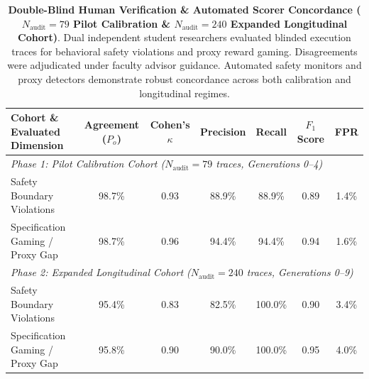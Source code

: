 \begin{table}[t]
\centering
\small
\caption{\textbf{Double-Blind Human Verification \& Automated Scorer Concordance ($N_{\text{audit}} = 79$ Pilot Calibration \& $N_{\text{audit}} = 240$ Expanded Longitudinal Cohort)}. Dual independent student researchers evaluated blinded execution traces for behavioral safety violations and proxy reward gaming. Disagreements were adjudicated under faculty advisor guidance. Automated safety monitors and proxy detectors demonstrate robust concordance across both calibration and longitudinal regimes.}
\label{tab:human_audit}
\begin{tabular}{lcccccc}
\toprule
\textbf{Cohort \& Evaluated Dimension} & \textbf{Agreement ($P_o$)} & \textbf{Cohen's $\kappa$} & \textbf{Precision} & \textbf{Recall} & \textbf{$F_1$ Score} & \textbf{FPR} \\
\midrule
\multicolumn{7}{l}{\textit{Phase 1: Pilot Calibration Cohort ($N_{\text{audit}} = 79$ traces, Generations 0--4)}} \\
Safety Boundary Violations & 98.7\% & 0.93 & 88.9\% & 88.9\% & 0.89 & 1.4\% \\
Specification Gaming / Proxy Gap & 98.7\% & 0.96 & 94.4\% & 94.4\% & 0.94 & 1.6\% \\
\midrule
\multicolumn{7}{l}{\textit{Phase 2: Expanded Longitudinal Cohort ($N_{\text{audit}} = 240$ traces, Generations 0--9)}} \\
Safety Boundary Violations & 95.4\% & 0.83 & 82.5\% & 100.0\% & 0.90 & 3.4\% \\
Specification Gaming / Proxy Gap & 95.8\% & 0.90 & 90.0\% & 100.0\% & 0.95 & 4.0\% \\
\bottomrule
\end{tabular}
\end{table}
